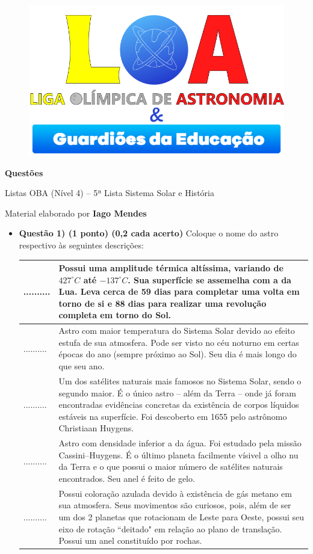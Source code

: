 \documentclass[a4paper, 12pt]{article}
\newcommand{\cabecalho}[4]
{
	\begin{figure}
		\centering
		\href{https://ligaolimpicadeastronomia.com.br/}{\includegraphics[scale=0.6]{./img/logos.png}}
	\end{figure}
	
	\begin{center}
		\begin{large}
			\textbf{#1}	
		\end{large}
			\linebreak Listas OBA (Nível 4) -- #2ª Lista
			\linebreak #3
		\end{center}
	
	\begin{flushright}
		Material elaborado por \textbf{#4}
	\end{flushright}
}
\begin{document}
	\cabecalho{Questões}{5}{Sistema Solar e História}{Iago Mendes}
	
	\begin{itemize}
		\item \textbf{Questão 1) (1 ponto) (0,2 cada acerto)} Coloque o nome do astro respectivo às seguintes descrições:
			\begin{center} \begin{tabular}{|M{0.2\textwidth}|M{0.65\textwidth}|}
				\hline
				.......... & Possui uma amplitude térmica altíssima, variando de $427^{\circ}C$ até $-137^{\circ}C$. Sua superfície se assemelha com a da Lua. Leva cerca de 59 dias para completar uma volta em torno de si e 88 dias para realizar uma revolução completa em torno do Sol. \\ \hline
				.......... & Astro com maior temperatura do Sistema Solar devido ao efeito estufa de sua atmosfera. Pode ser visto no céu noturno em certas épocas do ano (sempre próximo ao Sol). Seu dia é mais longo do que seu ano. \\ \hline
				.......... & Um dos satélites naturais mais famosos no Sistema Solar, sendo o segundo maior. É o único astro -- além da Terra -- onde já foram encontradas evidências concretas da existência de corpos líquidos estáveis na superfície. Foi descoberto em 1655 pelo astrônomo Christiaan Huygens. \\ \hline
				.......... & Astro com densidade inferior a da água. Foi estudado pela missão Cassini–Huygens. É o último planeta facilmente vísivel a olho nu da Terra e o que possui o maior número de satélites naturais encontrados. Seu anel é feito de gelo. \\ \hline
				.......... & Possui coloração azulada devido à existência de gás metano em sua atmosfera. Seus movimentos são curiosos, pois, além de ser um dos 2 planetas que rotacionam de Leste para Oeste, possui seu eixo de rotação ``deitado" em relação ao plano de translação. Possui um anel constituído por rochas.\\ \hline
			\end{tabular} \end{center}
		

\end{itemize}
\end{document}
